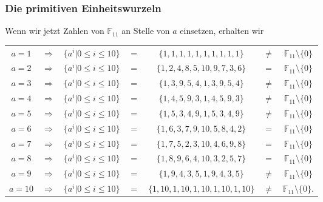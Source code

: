 \subsubsection{Die primitiven Einheitswurzeln
	\label{reedsolomon:subsection:primsqrt}}

Wenn wir jetzt Zahlen von $\mathbb{F}_{11}$ an Stelle von $a$ einsetzen, erhalten wir
\begin{center}
\begin{tabular}{c c c c c c c}
$a = 1$ & $\Rightarrow$ & $\{a^i | 0 \le i \le 10\}$ & $=$ & $\{1, 1, 1, 1, 1, 1, 1, 1, 1, 1\}$ & $\neq$ & $\mathbb{F}_{11}\setminus\{0\}$ \\
$a = 2$ & $\Rightarrow$ & $\{a^i | 0 \le i \le 10\}$ & $=$ & $\{1, 2, 4, 8, 5, 10, 9, 7, 3, 6\}$ & $ = $ & $\mathbb{F}_{11}\setminus\{0\}$ \\
$a = 3$ & $\Rightarrow$ & $\{a^i | 0 \le i \le 10\}$ & $=$ & $\{1, 3, 9, 5, 4, 1, 3, 9, 5, 4\}$ & $\neq$ & $\mathbb{F}_{11}\setminus\{0\}$ \\
$a = 4$ & $\Rightarrow$ & $\{a^i | 0 \le i \le 10\}$ & $=$ & $\{1, 4, 5, 9, 3, 1, 4, 5, 9, 3\}$ & $\neq$ & $\mathbb{F}_{11}\setminus\{0\}$ \\
$a = 5$ & $\Rightarrow$ & $\{a^i | 0 \le i \le 10\}$ & $=$ & $\{1, 5, 3, 4, 9, 1, 5, 3, 4, 9\}$ & $\neq$ & $\mathbb{F}_{11}\setminus\{0\}$ \\
$a = 6$ & $\Rightarrow$ & $\{a^i | 0 \le i \le 10\}$ & $=$ & $\{1, 6, 3, 7, 9, 10, 5, 8, 4, 2\}$ & $ = $ & $\mathbb{F}_{11}\setminus\{0\}$ \\
$a = 7$ & $\Rightarrow$ & $\{a^i | 0 \le i \le 10\}$ & $=$ & $\{1, 7, 5, 2, 3, 10, 4, 6, 9, 8\}$ & $ = $ & $\mathbb{F}_{11}\setminus\{0\}$ \\
$a = 8$ & $\Rightarrow$ & $\{a^i | 0 \le i \le 10\}$ & $=$ & $\{1, 8, 9, 6, 4, 10, 3, 2, 5, 7\}$ & $ = $ & $\mathbb{F}_{11}\setminus\{0\}$ \\
$a = 9$ & $\Rightarrow$ & $\{a^i | 0 \le i \le 10\}$ & $=$ & $\{1, 9, 4, 3, 5, 1, 9, 4, 3, 5\}$ & $\neq$ & $\mathbb{F}_{11}\setminus\{0\}$ \\
$a = 10$ & $\Rightarrow$ & $\{a^i | 0 \le i \le 10\}$ & $=$ & $\{1, 10, 1, 10, 1, 10, 1, 10, 1, 10\}$ & $\neq$ & $\mathbb{F}_{11}\setminus\{0\}$. \\
\end{tabular}
\end{center}
